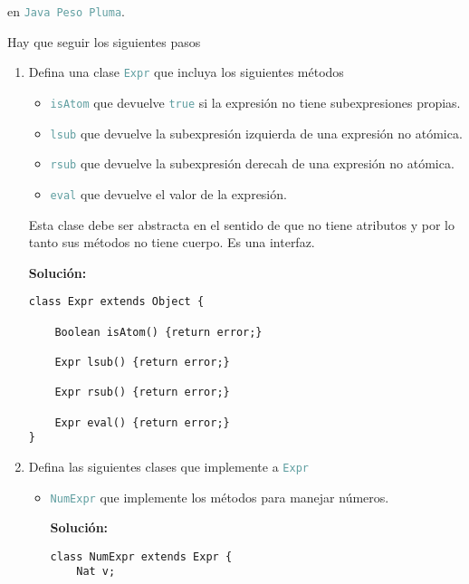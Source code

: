 \documentclass{article}
\newcommand{\tp}[1]{\textcolor{CadetBlue} {\texttt{#1}}}
\newcommand{\tb}[1]{\textcolor{RoyalPurple} {\textbf{#1}}}
\begin{document}
\begin{enumerate}
        en \tp{Java Peso Pluma}.

        Hay que seguir los siguientes pasos

        \begin{enumerate}
            \item Defina una clase \tp{Expr} que incluya los siguientes métodos

            \begin{itemize}
                \item \tp{isAtom} que devuelve \tp{true} si la expresión no
                tiene subexpresiones propias.

                \item \tp{lsub} que devuelve la subexpresión izquierda de una
                expresión no atómica.

                \item \tp{rsub} que devuelve la subexpresión derecah de una
                expresión no atómica.

                \item \tp{eval} que devuelve el valor de la expresión.
            \end{itemize}

            Esta clase debe ser abstracta en el sentido de que no tiene
            atributos y por lo tanto sus métodos no tiene cuerpo. Es una
            interfaz.

            \tb{Solución:}

            \begin{verbatim}
class Expr extends Object {

    Boolean isAtom() {return error;}

    Expr lsub() {return error;}

    Expr rsub() {return error;}

    Expr eval() {return error;}
}
            \end{verbatim}

            \item Defina las siguientes clases que implemente a \tp{Expr}

            \begin{itemize}
                \item \tp{NumExpr} que implemente los métodos para manejar
                números.

                \tb{Solución:}

                \begin{verbatim}
class NumExpr extends Expr {
    Nat v;


\end{verbatim}
\end{itemize}
\end{enumerate}
\end{enumerate}
\end{document}
